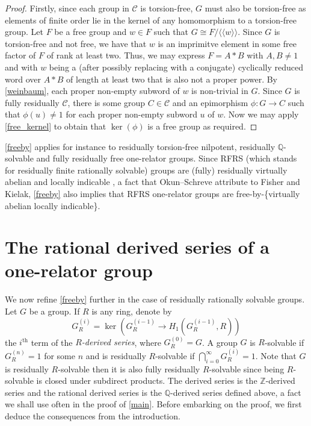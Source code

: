 \documentclass{amsart}
\theoremstyle{definition}
\newcommand{\Z}{\mathbb{Z}}
\newcommand{\Q}{\mathbb{Q}}
\newcommand{\normal}[1]{\langle\!\langle #1 \rangle\!\rangle}
\begin{document}
\begin{proof}
Firstly, since each group in $\mathcal{C}$ is torsion-free, $G$ must also be torsion-free as elements of finite order lie in the kernel of any homomorphism to a torsion-free group. Let $F$ be a free group and $w\in F$ such that $G\cong F/\normal{w}$. Since $G$ is torsion-free and not free, we have that $w$ is an imprimitve element in some free factor of $F$ of rank at least two. Thus, we may express $F = A*B$ with $A, B\neq 1$ and with $w$ being a (after possibly replacing with a conjugate) cyclically reduced word over $A*B$ of length at least two that is also not a proper power. By \cref{weinbaum}, each proper non-empty subword of $w$ is non-trivial in $G$. Since $G$ is fully residually $\mathcal{C}$, there is some group $C\in \mathcal{C}$ and an epimorphism $\phi\colon G\to C$ such that $\phi(u)\neq 1$ for each proper non-empty subword $u$ of $w$. Now we may apply \cref{free_kernel} to obtain that $\ker(\phi)$ is a free group as required.
\end{proof}

\cref{freeby} applies for instance to residually torsion-free nilpotent, residually $\Q$-solvable and fully residually free one-relator groups. Since RFRS (which stands for residually finite rationally solvable) groups are (fully) residually virtually abelian and locally indicable \cite[Theorem 6.3]{OS24}, a fact that Okun--Schreve attribute to Fisher and Kielak, \cref{freeby} also implies that RFRS one-relator groups are free-by-\{virtually abelian locally indicable\}. 


\section{The rational derived series of a one-relator group}

We now refine \cref{freeby} further in the case of residually rationally solvable groups. Let $G$ be a group. If $R$ is any ring, denote by
\[
G^{(i)}_{R} = \ker\left(G^{(i-1)}_{R}\to H_1\left(G^{(i-1)}_{R}, R\right)\right)
\]
the $i^{\text{th}}$ term of the \emph{$R$-derived series}, where $G^{(0)}_{R} = G$. A group $G$ is $R$-solvable if $G_{R}^{(n)} = 1$ for some $n$ and is residually $R$-solvable if $\bigcap_{i=0}^{\infty}G_{R}^{(i)} = 1$. Note that $G$ is residually $R$-solvable then it is also fully residually $R$-solvable since being $R$-solvable is closed under subdirect products. The derived series is the $\Z$-derived series and the rational derived series is the $\Q$-derived series defined above, a fact we shall use often in the proof of \cref{main}. Before embarking on the proof, we first deduce the consequences from the introduction.
\end{document}
